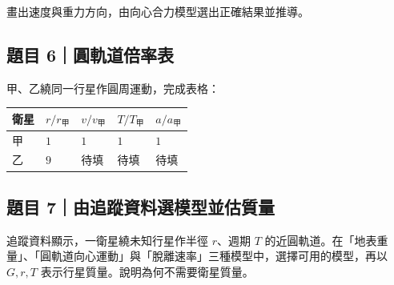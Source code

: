 \documentclass[11pt,a4paper]{article}
\newcounter{none}
\begin{document}
畫出速度與重力方向，由向心合力模型選出正確結果並推導。

\subsection{題目 6｜圓軌道倍率表}\label{ux984cux76ee-6ux5713ux8eccux9053ux500dux7387ux8868}

甲、乙繞同一行星作圓周運動，完成表格：

{\def\LTcaptype{none} %
\begin{longtable}[]{@{}
  >{\raggedright\arraybackslash}p{}
  >{\raggedleft\arraybackslash}p{}
  >{\raggedleft\arraybackslash}p{}
  >{\raggedleft\arraybackslash}p{}
  >{\raggedleft\arraybackslash}p{}@{}}
\toprule\noalign{}
\begin{minipage}[b]{\linewidth}\raggedright
衛星
\end{minipage} & \begin{minipage}[b]{\linewidth}\raggedleft
\(r/r_{\text{甲}}\)
\end{minipage} & \begin{minipage}[b]{\linewidth}\raggedleft
\(v/v_{\text{甲}}\)
\end{minipage} & \begin{minipage}[b]{\linewidth}\raggedleft
\(T/T_{\text{甲}}\)
\end{minipage} & \begin{minipage}[b]{\linewidth}\raggedleft
\(a/a_{\text{甲}}\)
\end{minipage} \\
\midrule\noalign{}
\endhead
\bottomrule\noalign{}
\endlastfoot
甲 & \(1\) & \(1\) & \(1\) & \(1\) \\
乙 & \(9\) & \(\text{待填}\) & \(\text{待填}\) & \(\text{待填}\) \\
\end{longtable}
}

\subsection{題目 7｜由追蹤資料選模型並估質量}\label{ux984cux76ee-7ux7531ux8ffdux8e64ux8cc7ux6599ux9078ux6a21ux578bux4e26ux4f30ux8ceaux91cf}

追蹤資料顯示，一衛星繞未知行星作半徑 \(r\)、週期 \(T\) 的近圓軌道。在「地表重量」、「圓軌道向心運動」與「脫離速率」三種模型中，選擇可用的模型，再以 \(G,r,T\) 表示行星質量。說明為何不需要衛星質量。
\end{document}
